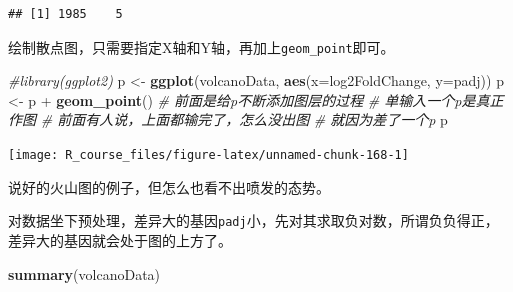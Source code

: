 \documentclass[]{article}
\newenvironment{Shaded}{\begin{snugshade}}{\end{snugshade}}
\newcommand{\KeywordTok}[1]{\textcolor[rgb]{0.13,0.29,0.53}{\textbf{{#1}}}}
\newcommand{\DataTypeTok}[1]{\textcolor[rgb]{0.13,0.29,0.53}{{#1}}}
\newcommand{\DecValTok}[1]{\textcolor[rgb]{0.00,0.00,0.81}{{#1}}}
\newcommand{\FloatTok}[1]{\textcolor[rgb]{0.00,0.00,0.81}{{#1}}}
\newcommand{\StringTok}[1]{\textcolor[rgb]{0.31,0.60,0.02}{{#1}}}
\newcommand{\CommentTok}[1]{\textcolor[rgb]{0.56,0.35,0.01}{\textit{{#1}}}}
\newcommand{\NormalTok}[1]{{#1}}
\numberwithin{figure}{section}
\numberwithin{table}{section}
\theoremstyle{definition}
\theoremstyle{definition}
\theoremstyle{definition}
\theoremstyle{remark}
\begin{document}
\begin{verbatim}
## [1] 1985    5
\end{verbatim}

绘制散点图，只需要指定X轴和Y轴，再加上\texttt{geom\_point}即可。

\begin{Shaded}
\begin{Highlighting}[]
\CommentTok{#library(ggplot2)}
\NormalTok{p <-}\StringTok{ }\KeywordTok{ggplot}\NormalTok{(volcanoData, }\KeywordTok{aes}\NormalTok{(}\DataTypeTok{x=}\NormalTok{log2FoldChange, }\DataTypeTok{y=}\NormalTok{padj))}
\NormalTok{p <-}\StringTok{ }\NormalTok{p +}\StringTok{ }\KeywordTok{geom_point}\NormalTok{()}
\CommentTok{# 前面是给p不断添加图层的过程}
\CommentTok{# 单输入一个p是真正作图}
\CommentTok{# 前面有人说，上面都输完了，怎么没出图}
\CommentTok{# 就因为差了一个p}
\NormalTok{p}
\end{Highlighting}
\end{Shaded}

\begin{center}\texttt{[image: R\_course\_files/figure-latex/unnamed-chunk-168-1]} \end{center}

说好的火山图的例子，但怎么也看不出喷发的态势。

对数据坐下预处理，差异大的基因\texttt{padj}小，先对其求取负对数，所谓负负得正，差异大的基因就会处于图的上方了。

\begin{Shaded}
\end{Shaded}

\begin{Shaded}
\begin{Highlighting}[]
\KeywordTok{summary}\NormalTok{(volcanoData)}
\end{Highlighting}
\end{Shaded}
\end{document}
